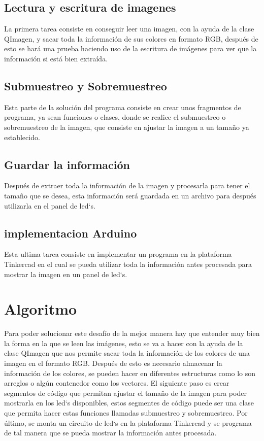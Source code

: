 \documentclass{article}
\begin{document}
\subsection{Lectura y escritura de imagenes}
La primera tarea consiste en conseguir leer una imagen, con la ayuda de la clase QImagen, y sacar toda la información de sus colores en formato RGB, después de esto se hará una prueba haciendo uso de la escritura de imágenes para ver que la información si está bien extraída.
\subsection{Submuestreo y Sobremuestreo}
Esta parte de la solución del programa consiste en crear unos fragmentos de programa, ya sean funciones o clases, donde se realice el submuestreo o sobremuestreo de la imagen, que consiste en ajustar la imagen a un tamaño ya establecido.
\subsection{Guardar la información}
Después de extraer toda la información de la imagen y procesarla para tener el tamaño que se desea, esta información será guardada en un archivo para después utilizarla en el panel de led`s.
\subsection{implementacion Arduino}
Esta ultima tarea consiste en implementar un programa en la plataforma Tinkercad en el cual se pueda utilizar toda la información antes procesada para mostrar la imagen en un panel de led`s.

\section{Algoritmo}\label{intro}
Para poder solucionar este desafío de la mejor manera hay que entender muy bien la forma en la que se leen las imágenes, esto se va a hacer con la ayuda de la clase QImagen que nos permite sacar toda la información de los colores de una imagen en el formato RGB. Después de esto es necesario almacenar la información de los colores, se pueden hacer en diferentes estructuras como lo son arreglos o algún contenedor como los vectores. El siguiente paso es crear segmentos de código que permitan ajustar el tamaño de la imagen para poder mostrarla en los led`s disponibles, estos segmentes de código puede ser una clase que permita hacer estas funciones llamadas submuestreo y sobremuestreo. Por último, se monta un circuito de led`s en la plataforma Tinkercad y se programa de tal manera que se pueda mostrar la información antes procesada.
\end{document}
